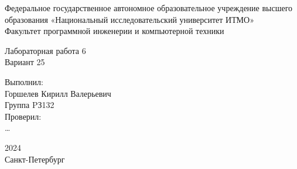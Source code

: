 \documentclass[a4paper, 20pt]{article}
\begin{document}
\thispagestyle{empty}
\begin{center}
    Федеральное государственное автономное образовательное учреждение высшего образования «Национальный исследовательский университет ИТМО»\\
    Факультет программной инженерии и компьютерной техники\\

\vspace*{150pt}

    Лабораторная работа 6\\
    Вариант 25\\

\vspace*{150pt}
\end{center}

\begin{flushright}
    \parbox{150pt}{
        Выполнил:\\
        Горшелев Кирилл Валерьевич\\
        Группа PЗ132\\
        Проверил:\\
        \dots
    }
\end{flushright}

\begin{center}
    \vfill
    2024\\
    Санкт-Петербург
\end{center}
\end{document}

